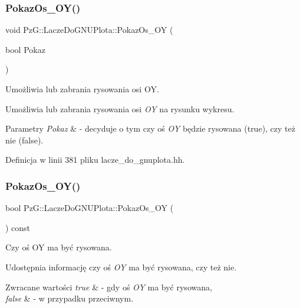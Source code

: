 \subsubsection{\texorpdfstring{Pokaz\+Os\+\_\+\+O\+Y()}{PokazOs\_OY()}\hspace{0.1cm}{\footnotesize\ttfamily [1/2]}}
{\footnotesize\ttfamily void Pz\+G\+::\+Lacze\+Do\+G\+N\+U\+Plota\+::\+Pokaz\+Os\+\_\+\+OY (\begin{DoxyParamCaption}\item[{bool}]{Pokaz }\end{DoxyParamCaption})\hspace{0.3cm}{\ttfamily [inline]}}



Umożliwia lub zabrania rysowania osi OY. 

Umożliwia lub zabrania rysowania osi {\itshape OY} na rysunku wykresu. 
\begin{DoxyParams}{Parametry}
{\em Pokaz} & -\/ decyduje o tym czy oś {\itshape OY} będzie rysowana ({\ttfamily true}), czy też nie ({\ttfamily false}). \\
\hline
\end{DoxyParams}


Definicja w linii 381 pliku lacze\+\_\+do\+\_\+gnuplota.\+hh.

\mbox{\label{class_pz_g_1_1_lacze_do_g_n_u_plota_a7298f469f6932f5c808dcf620650b4b8}} 
\subsubsection{\texorpdfstring{Pokaz\+Os\+\_\+\+O\+Y()}{PokazOs\_OY()}\hspace{0.1cm}{\footnotesize\ttfamily [2/2]}}
{\footnotesize\ttfamily bool Pz\+G\+::\+Lacze\+Do\+G\+N\+U\+Plota\+::\+Pokaz\+Os\+\_\+\+OY (\begin{DoxyParamCaption}{ }\end{DoxyParamCaption}) const\hspace{0.3cm}{\ttfamily [inline]}}



Czy oś OY ma być rysowana. 

Udostępnia informację czy oś {\itshape OY} ma być rysowana, czy też nie. 
\begin{DoxyRetVals}{Zwracane wartości}
{\em true} & -\/ gdy oś {\itshape OY} ma być rysowana, \\
\hline
{\em false} & -\/ w przypadku przeciwnym. \\
\hline
\end{DoxyRetVals}


